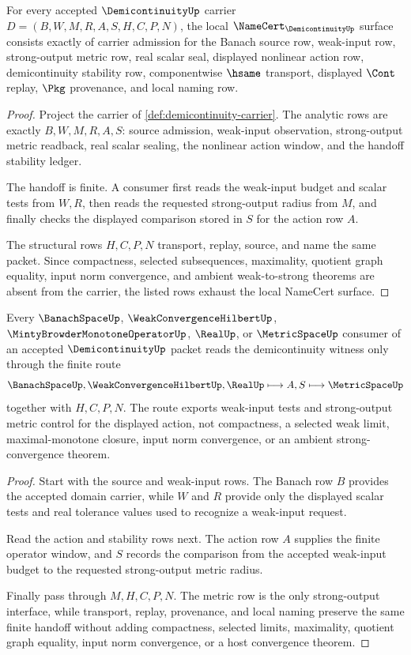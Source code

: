 \begin{theorem}
\label{thm:demicontinuity-namecert-obligations}
For every accepted $\DemicontinuityUp$ carrier $D=(B,W,M,R,A,S,H,C,P,N)$, the local $\NameCert_{\DemicontinuityUp}$ surface consists exactly of carrier admission for the Banach source row, weak-input row, strong-output metric row, real scalar seal, displayed nonlinear action row, demicontinuity stability row, componentwise $\hsame$ transport, displayed $\Cont$ replay, $\Pkg$ provenance, and local naming row.
\end{theorem}
\begin{proof}
Project the carrier of \autoref{def:demicontinuity-carrier}. The analytic rows are exactly $B,W,M,R,A,S$: source admission, weak-input observation, strong-output metric readback, real scalar sealing, the nonlinear action window, and the handoff stability ledger.

The handoff is finite. A consumer first reads the weak-input budget and scalar tests from $W,R$, then reads the requested strong-output radius from $M$, and finally checks the displayed comparison stored in $S$ for the action row $A$.

The structural rows $H,C,P,N$ transport, replay, source, and name the same packet. Since compactness, selected subsequences, maximality, quotient graph equality, input norm convergence, and ambient weak-to-strong theorems are absent from the carrier, the listed rows exhaust the local NameCert surface.
\end{proof}

\begin{theorem}
\label{thm:demicontinuity-weak-strong-handoff}
Every $\BanachSpaceUp$, $\WeakConvergenceHilbertUp$, $\MintyBrowderMonotoneOperatorUp$, $\RealUp$, or $\MetricSpaceUp$ consumer of an accepted $\DemicontinuityUp$ packet reads the demicontinuity witness only through the finite route
$$
\BanachSpaceUp,\WeakConvergenceHilbertUp,\RealUp
\longmapsto A,S
\longmapsto \MetricSpaceUp
$$
together with $H,C,P,N$. The route exports weak-input tests and strong-output metric control for the displayed action, not compactness, a selected weak limit, maximal-monotone closure, input norm convergence, or an ambient strong-convergence theorem.
\end{theorem}
\begin{proof}
Start with the source and weak-input rows. The Banach row $B$ provides the accepted domain carrier, while $W$ and $R$ provide only the displayed scalar tests and real tolerance values used to recognize a weak-input request.

Read the action and stability rows next. The action row $A$ supplies the finite operator window, and $S$ records the comparison from the accepted weak-input budget to the requested strong-output metric radius.

Finally pass through $M,H,C,P,N$. The metric row is the only strong-output interface, while transport, replay, provenance, and local naming preserve the same finite handoff without adding compactness, selected limits, maximality, quotient graph equality, input norm convergence, or a host convergence theorem.
\end{proof}

